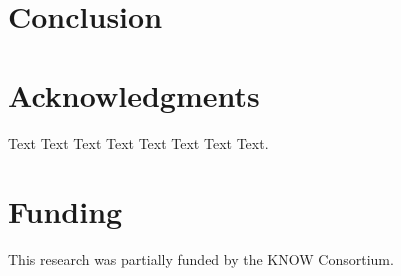 \documentclass{bioinfo}
\begin{document}
\section{Conclusion}



\section*{Acknowledgments}

Text Text Text Text Text Text  Text Text. 

\section*{Funding}

This research was partially funded by the KNOW Consortium.


%
%
%
%
%
%
%

\end{document}
